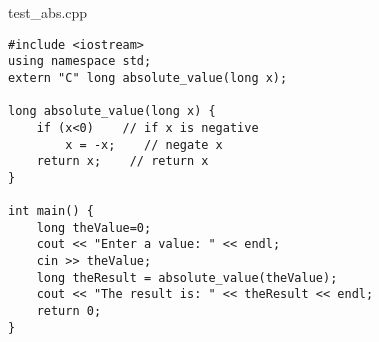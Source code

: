 \begin{frame}[fragile,label=absValueC]{test\_abs.cpp}
\lstset{
    language=C++,
    style=small,
}
\begin{lstlisting}
#include <iostream>
using namespace std;
extern "C" long absolute_value(long x);

long absolute_value(long x) {
    if (x<0)    // if x is negative
        x = -x;    // negate x
    return x;    // return x
}

int main() {
    long theValue=0;
    cout << "Enter a value: " << endl;
    cin >> theValue;
    long theResult = absolute_value(theValue);
    cout << "The result is: " << theResult << endl;
    return 0;
}
\end{lstlisting}
\end{frame}
